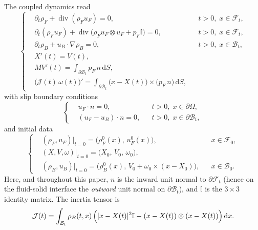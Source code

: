 \documentclass[11pt,twoside,reqno]{amsart}
\numberwithin{equation}{section}
\numberwithin{figure}{section}
\begin{document}
The coupled dynamics read
\begin{equation}\label{eq:model}
\left\{
\begin{aligned}
    &\partial_t \rho_F + \operatorname{div}(\rho_F u_F) = 0,
    && t>0,\; x \in \mathcal{F}_t, \\[2pt]
    &\partial_t(\rho_F u_F) + \operatorname{div}\bigl(\rho_F u_F \otimes u_F + p_F \mathbb{I}\bigr) = 0,
    && t>0,\; x \in \mathcal{F}_t, \\[2pt]
    &\partial_t \rho_B + u_B \cdot \nabla \rho_B = 0,
    && t>0,\; x \in \mathcal{B}_t, \\[2pt]
    &X'(t) = V(t), \\[2pt]
    &M V'(t) = \displaystyle\int_{\partial \mathcal{B}_t} p_F\, n \, \mathrm{d}S, \\[6pt]
    &\bigl(\mathcal{J}(t)\,\omega(t)\bigr)' 
        = \displaystyle\int_{\partial \mathcal{B}_t} \bigl(x - X(t)\bigr) \times \bigl(p_F\, n\bigr)\, \mathrm{d}S,
\end{aligned}
\right.
\end{equation}
with slip boundary conditions
\begin{equation}\label{eq:bc}
\left\{
\begin{aligned}
    &u_F \cdot n = 0, && t>0,\; x \in \partial\Omega,\\
    &(u_F - u_B) \cdot n = 0, && t>0,\; x \in \partial\mathcal{B}_t,
\end{aligned}
\right.
\end{equation}
and initial data
\begin{equation}\label{eq:ic}
\left\{
\begin{aligned}
    &(\rho_F, u_F)\big|_{t=0} = \bigl(\rho_F^0(x),\, u_F^0(x)\bigr),
        && x \in \mathcal{F}_0,\\
    &(X,V,\omega)\big|_{t=0} = \bigl(X_0,\, V_0,\, \omega_0\bigr),\\
    &(\rho_B, u_B)\big|_{t=0} = \bigl(\rho_B^0(x),\, V_0 + \omega_0 \times (x-X_0)\bigr),
        && x \in \mathcal{B}_0.
\end{aligned}
\right.
\end{equation}
Here, and throughout this paper, $n$ is the inward unit normal to $\partial\mathcal{F}_t$ (hence on the fluid-solid interface the \emph{outward} unit normal on $\partial\mathcal{B}_t$), and $\mathbb{I}$ is the $3\times 3$ identity matrix. The inertia tensor is
\begin{equation}\label{eq:inertia}
    \mathcal{J}(t) = \int_{\mathcal{B}_t} \rho_B(t,x)\,\Bigl( |x - X(t)|^2 \mathbb{I}
    - (x - X(t)) \otimes (x - X(t)) \Bigr)\, \mathrm{d}x .
\end{equation}
\end{document}
